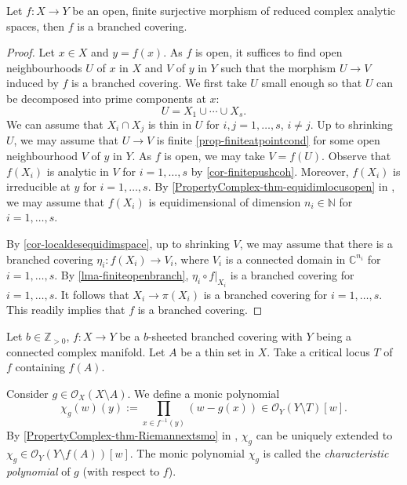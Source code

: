 \begin{thm}
    Let $f:X\rightarrow Y$ be an open, finite surjective morphism of reduced complex analytic spaces, then $f$ is a branched covering.
\end{thm}
\begin{proof}
    Let $x\in X$ and $y=f(x)$. As $f$ is open, it suffices to find open neighbourhoods $U$ of $x$ in $X$ and $V$ of $y$ in $Y$ such that the morphism $U\rightarrow V$ induced by $f$ is a branched covering. 
    We first take $U$ small enough so that $U$ can be decomposed into prime components at $x$:
    \[
        U=X_1\cup\cdots\cup X_s.
    \]  
    We can assume that $X_i\cap X_j$ is thin in $U$ for $i,j=1,\ldots,s$, $i\neq j$. Up to shrinking $U$, we may assume that $U\rightarrow V$ is finite \cref{prop-finiteatpointcond} for some open neighbourhood $V$ of $y$ in $Y$. As $f$ is open, we may take $V=f(U)$.
    Observe that $f(X_i)$ is analytic in $V$ for $i=1,\ldots,s$ by \cref{cor-finitepushcoh}. Moreover, $f(X_i)$ is irreducible at $y$ for $i=1,\ldots,s$. By \cref{PropertyComplex-thm-equidimlocusopen} in , we may assume that $f(X_i)$ is equidimensional of dimension $n_i\in \mathbb{N}$ for $i=1,\ldots,s$.
    
    By \cref{cor-localdesequidimspace}, up to shrinking $V$, we may assume that there is a branched covering $\eta_i:f(X_i)\rightarrow V_i$, where $V_i$ is a connected domain in $\mathbb{C}^{n_i}$ for $i=1,\ldots,s$. By \cref{lma-finiteopenbranch}, $\eta_i\circ f|_{X_i}$ is a branched covering for $i=1,\ldots,s$.  It follows that $X_i\rightarrow \pi(X_i)$ is a branched covering for $i=1,\ldots,s$. This readily implies that $f$ is a branched covering.
\end{proof}

\begin{definition}
    Let $b\in \mathbb{Z}_{>0}$, $f:X\rightarrow Y$ be a $b$-sheeted branched covering with $Y$ being a connected complex manifold. Let $A$ be a thin set in $X$. Take a critical locus $T$ of $f$ containing $f(A)$. 
    
    Consider $g\in \mathcal{O}_X(X\setminus A)$. We define a monic polynomial
    \[
        \chi_g(w)(y):=\prod_{x\in f^{-1}(y)} (w-g(x))\in \mathcal{O}_Y(Y\setminus T)[w]. 
    \]
    By \cref{PropertyComplex-thm-Riemannextsmo} in , $\chi_g$ can be uniquely extended to $\chi_g\in \mathcal{O}_Y(Y\setminus f(A))[w]$. The monic polynomial $\chi_g$ is called the \emph{characteristic polynomial} of $g$ (with respect to $f$).
\end{definition}


